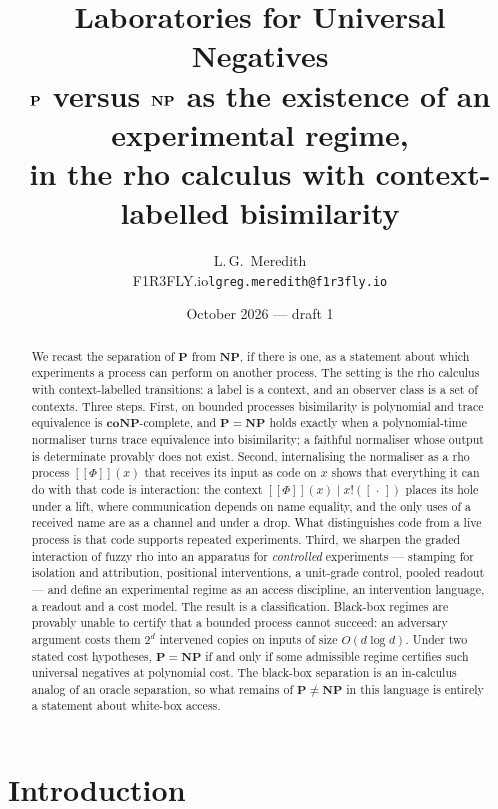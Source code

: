 \documentclass[11pt]{article}
\title{\textbf{Laboratories for Universal Negatives}\\[4pt]
\large $\Pclass$ versus $\NPclass$ as the existence of an experimental regime,\\
in the rho calculus with context-labelled bisimilarity}
\author{L.\,G.\ Meredith\\[2pt] \normalsize F1R3FLY.io\quad \texttt{lgreg.meredith@f1r3fly.io}}
\date{October 2026 --- draft 1}
\theoremstyle{definition}
\theoremstyle{plain}
\theoremstyle{remark}
\newcommand{\out}[2]{#1!(#2)}
\newcommand{\enc}[1]{[\![#1]\!]}
\newcommand{\hole}{[\,\cdot\,]}
\newcommand{\Pclass}{\mathbf{P}}
\newcommand{\NPclass}{\mathbf{NP}}
\newcommand{\coNP}{\mathbf{coNP}}
\begin{document}
\maketitle

\begin{abstract}
\noindent
We recast the separation of $\Pclass$ from $\NPclass$, if there is one,
as a statement about which experiments a process can perform on another
process. The setting is the rho calculus with context-labelled
transitions: a label is a context, and an observer class is a set of
contexts. Three steps. First, on bounded processes bisimilarity is
polynomial and trace equivalence is $\coNP$-complete, and $\Pclass =
\NPclass$ holds exactly when a polynomial-time normaliser turns trace
equivalence into bisimilarity; a faithful normaliser whose output is
determinate provably does not exist. Second, internalising the normaliser as a rho
process $\enc{\Phi}(x)$ that receives its input as code on $x$ shows that
everything it can do with that code is interaction: the context
$\enc{\Phi}(x) \mid \out{x}{\hole}$ places its hole under a lift, where
communication depends on name equality, and the only uses of a received
name are as a channel and under a drop. What distinguishes code from a
live process is that code supports repeated experiments. Third, we
sharpen the graded interaction of fuzzy rho into an apparatus for
\emph{controlled} experiments --- stamping for isolation and attribution,
positional interventions, a unit-grade control, pooled readout --- and
define an experimental regime as an access discipline, an intervention
language, a readout and a cost model. The result is a classification.
Black-box regimes are provably unable to certify that a bounded process
cannot succeed: an adversary argument costs them $2^d$ intervened copies
on inputs of size $O(d \log d)$. Under two stated cost hypotheses, $\Pclass = \NPclass$ if
and only if some admissible regime certifies such universal negatives at
polynomial cost. The black-box separation is an in-calculus analog of
an oracle separation, so what remains of $\Pclass \neq \NPclass$ in this
language is entirely a statement about white-box access.
\end{abstract}

\section{Introduction}\label{sec:intro}
\end{document}
